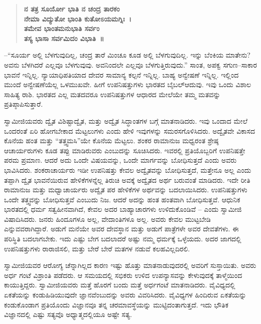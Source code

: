 \begin{verse}
\textbf{ನ ತತ್ರ ಸೂರ್ಯೋ ಭಾತಿ ನ ಚಂದ್ರ ತಾರಕಂ}\\\textbf{ನೇಮಾ ವಿದ್ಯುತೋ ಭಾಂತಿ ಕುತೋಽಯಮಗ್ನಿಃ~।}\\\textbf{ತಮೇವ ಭಾಂತಮನುಭಾತಿ ಸರ್ವಂ}\\\textbf{ತಸ್ಯ ಭಾಸಾ ಸರ್ವಮಿದಂ ವಿಭಾತಿ~॥}
\end{verse}

–“ಸೂರ್ಯ ಅಲ್ಲಿ ಬೆಳಗುವುದಿಲ್ಲ, ಚಂದ್ರ ತಾರೆ ಮಿಂಚೂ ಕೂಡ ಅಲ್ಲಿ ಬೆಳಗುವುದಿಲ್ಲ. ಇನ್ನು ಬೆಂಕಿಯ ಮಾತೇನು? ಅವನು ಬೆಳಗಿದರೆ ಎಲ್ಲವೂ ಬೆಳಗುವುವು. ಅವನಿಂದಲೇ ಎಲ್ಲವೂ ಬೆಳಗುತ್ತಿರುವುದು.” ಸಾಂತ, ಅಪಕ್ವ ಸಗುಣ–ಸಾಕಾರ ಭಾವನೆ ಇನ್ನಿಲ್ಲ. ನ್ಯಾಯಾಧಿಪತಿಯಾದ ದೇವರ ಸಾಮಾನ್ಯ ಕಲ್ಪನೆ ಇನ್ನಿಲ್ಲ. ಬಾಹ್ಯ ಅನ್ವೇಷಣೆ ಇನ್ನಿಲ್ಲ. ಇಲ್ಲಿಂದ ಮುಂದೆ ಅನ್ವೇಷಣೆಯೆಲ್ಲ ಒಳಮುಖವೇ. ಹೀಗೆ ಉಪನಿಷತ್ತುಗಳು ಭಾರತದ ಬೈಬಲ್​ ಆದುವು. ಇವು ಒಂದು ವಿಶಾಲ ಸಾಹಿತ್ಯ ರಾಶಿ. ಭಾರತದ ಎಲ್ಲ ಮತದವರೂ ಉಪನಿಷತ್ತುಗಳ ಆಧಾರದ ಮೇಲೆಯೇ ತಮ್ಮ ಮತವನ್ನು ಪ್ರತಿಪ್ಠಾಪಿಸುತ್ತಾರೆ. 

ಸ್ವಾಮೀಜಿಯವರು ದ್ವೈತ ವಿಶಿಷ್ಟಾದ್ವೈತ, ಮತ್ತು ಅದ್ವೈತ ಸಿದ್ಧಾಂತಗಳ ಬಗ್ಗೆ ಮಾತನಾಡಿದರು. ಇವು ಒಂದಾದ ಮೇಲೆ ಒಂದರಂತೆ ಏರಿ ಹೋಗಬೇಕಾದ ಮೆಟ್ಟಲುಗಳು ಎಂದು ಹೇಳಿ ಇವುಗಳನ್ನು ಸಮರಸಗೊಳಿಸಿದರು. ಅದ್ವೈತವೇ ವಿಕಾಸದ ಕೊನೆಯ ಹಂತ ಮತ್ತು “ತತ್ತ್ವಮಸಿ”ಯೇ ಕೊನೆಯ ಮೆಟ್ಟಲು. ಶಂಕರ ರಾಮಾನುಜ ಮಧ್ವರಂತ ಶ್ರೇಷ್ಠ ಆಚಾರ್ಯರುಗಳು ಕೂಡ ತಪ್ಪು ಮಾಡಿರುವರು ಎಂಬುದನ್ನು ಸೂಚಿಸಿದರು. ಇವರಲ್ಲಿ ಪ್ರತಿಯೊಬ್ಬರಿಗೆ ಉಪನಿಷತ್ತೇ ಪರಮ ಪ್ರಮಾಣ. ಆದರೆ ಅದು ಒಂದೇ ವಿಷಯವನ್ನು, ಒಂದೇ ಮಾರ್ಗವನ್ನು ಬೋಧಿಸುತ್ತದೆ ಎಂದು ಅವರು ಭಾವಿಸಿದರು. ಶಂಕರಾಚಾರ್ಯರು ಇಡೀ ಉಪನಿಷತ್ತು ಕೇವಲ ಅದ್ವೈತವನ್ನು ಬೋಧಿಸುತ್ತದೆ, ಮತ್ತೇನೂ ಅಲ್ಲ ಎಂದು ತಪ್ಪಾಗಿ ದ್ವೈತ ಭಾವನೆಯಿರುವ ಹೇಳಿಕೆಗಳನ್ನೆಲ್ಲ ತಿರುಚಿ ಅವಕ್ಕೆ ಅದ್ವೈತದ ಅರ್ಥ ಬರುವಂತೆ ಮಾಡಿದರು. ಇದೇ ರೀತಿ ರಾಮಾನುಜ ಮತ್ತು ಮಧ್ವಾಚಾರ್ಯರು ಅದ್ವೈತ ಪರ ಹೇಳಿಕೆಗಳ ಅರ್ಥವನ್ನು ಬದಲಾಯಿಸಿದರು. ಉಪನಿಷತ್ತುಗಳು ಒಂದೇ ತತ್ತ್ವವನ್ನು ಬೋಧಿಸುತ್ತವೆ ಎಂಬುದು ನಿಜ. ಆದರೆ ಅದನ್ನು ಹಂತ ಹಂತವಾಗಿ ಬೋಧಿಸುತ್ತವೆ. ಆಧುನಿಕ ಭಾರತದಲ್ಲಿ ಧರ್ಮ ಸತ್ವಹೀನವಾಗಿದೆ, ಕೇವಲ ಅದರ ಬಾಹ್ಯಾಚಾರಗಳು ಉಳಿದುಕೊಂಡಿವೆ – ಎಂದು ಸ್ವಾಮೀಜಿ ವಿಷಾದಿಸಿದರು. ಜನರು ಹಿಂದೂಗಳೂ ಅಲ್ಲ, ವೇದಾಂತಿಗಳೂ ಅಲ್ಲ. ಅವರು ಕೇವಲ ಮುಟ್ಟಬೇಡಿ ಎನ್ನುವವರಾಗಿದ್ದಾರೆ. ಅಡುಗೆ ಮನೆಯೇ ಅವರ ದೇವಸ್ಥಾನ ಮತ್ತು ಅಡುಗೆ ಪಾತ್ರೆಗಳೇ ಅವರ ದೇವತೆಗಳು. ಈ ಪರಿಸ್ಥಿತಿ ಬದಲಾಗಬೇಕು. ಇದು ಎಷ್ಟು ಬೇಗ ಬದಲಾದರೆ ಅಷ್ಟು ನಮ್ಮ ಧರ್ಮಕ್ಕೆ ಒಳ್ಳೆಯದು. ಅದರ ಜಾಗದಲ್ಲಿ ಉಪನಿಷತ್ತುಗಳು ರಾರಾಜಿಸಲಿ, ಮತ್ತು ಬೇರೆ ಬೇರೆ ಮತಗಳ ನಡುವೆ ಕಲಹವಿಲ್ಲದಿರಲಿ. 

ಸ್ವಾಮೀಜಿಯವರ ಆರೋಗ್ಯ ಚೆನ್ನಾಗಿಲ್ಲದ ಕಾರಣ ಇಷ್ಟು ಹೊತ್ತು ಮಾತನಾಡುವುದರಲ್ಲಿ ಅವರಿಗೆ ಸುಸ್ತಾಯಿತು. ಅವರು ಅರ್ಧ ಗಂಟೆ ವಿಶ್ರಾಂತಿ ಪಡೆದರು. ಆ ಸಮಯದಲ್ಲಿ ಸಭಿಕರು ಉಳಿದ ಉಪನ್ಯಾಸವನ್ನು ಕೇಳುವುದಕ್ಕೆ ತಾಳ್ಮೆಯಿಂದ ಕಾಯುತ್ತಿದ್ದರು. ಸ್ವಾಮೀಜಿಯವರು ಮತ್ತೆ ಹೊರಗೆ ಬಂದು ಮತ್ತೆ ಅರ್ಧಗಂಟೆ ಮಾತನಾಡಿದರು. ವೈವಿಧ್ಯದಲ್ಲಿ ಏಕತೆಯನ್ನು ಕಂಡುಹಿಡಿಯುವುದೇ ಜ್ಞಾನವೆಂಬುದನ್ನು ಅವರು ವಿವರಿಸಿದರು. ವೈವಿಧ್ಯಗಳ ಹಿಂದಿರುವ ಏಕತೆಯನ್ನು ಕಂಡುಕೊಂಡಾಗ ಪ್ರತಿಯೊಂದು ವಿಜ್ಞಾನವೂ ತನ್ನ ಚರಮಾವಸ್ಥೆಯನ್ನು ಮುಟ್ಟಿದಂತಾಗುತ್ತದೆ. ಇದು ಭೌತಿಕ ವಿಜ್ಞಾನದಲ್ಲಿ ಎಷ್ಟು ಸತ್ಯವೊ ಅಧ್ಯಾತ್ಮದಲ್ಲಿಯೂ ಅಷ್ಟೇ ಸತ್ಯ. 

